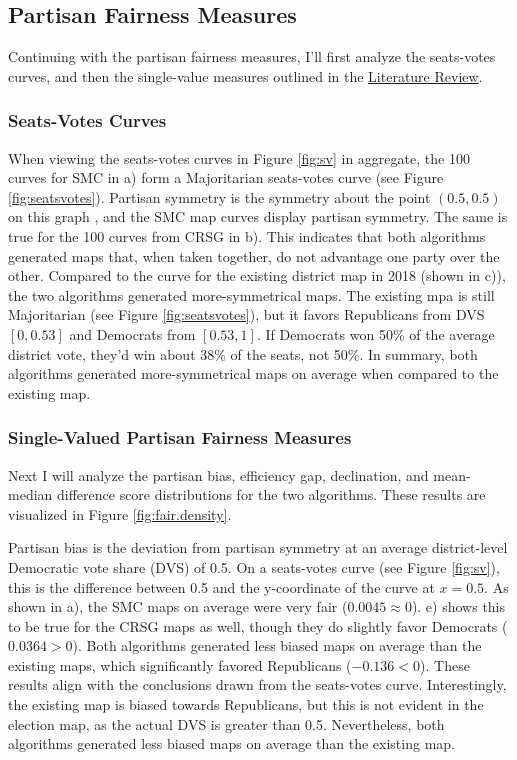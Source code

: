\subsection{Partisan Fairness Measures}

Continuing with the partisan fairness measures, I'll first analyze the seats-votes curves, and then the single-value measures outlined in the \hyperref[sec:litreview]{Literature Review}. 

\subsubsection{Seats-Votes Curves}

When viewing the seats-votes curves in Figure \ref{fig:sv} in aggregate, the 100 curves for SMC in a) form a Majoritarian seats-votes curve (see Figure \ref{fig:seatsvotes}). Partisan symmetry is the symmetry about the point $(0.5, 0.5)$ on this graph \parencite{katz2020}, and the SMC map curves display partisan symmetry. The same is true for the 100 curves from CRSG in b). This indicates that both algorithms generated maps that, when taken together, do not advantage one party over the other. Compared to the curve for the existing district map in 2018 (shown in c)), the two algorithms generated more-symmetrical maps. The existing mpa is still Majoritarian (see Figure \ref{fig:seatsvotes}), but it favors Republicans from DVS $[0, 0.53]$ and Democrats from $[0.53, 1]$. If Democrats won 50\% of the average district vote, they'd win about 38\% of the seats, not 50\%. In summary, both algorithms generated more-symmetrical maps on average when compared to the existing map. 

\subsubsection{Single-Valued Partisan Fairness Measures}

Next I will analyze the partisan bias, efficiency gap, declination, and mean-median difference score distributions for the two algorithms. These results are visualized in Figure \ref{fig:fair.density}.

Partisan bias is the deviation from partisan symmetry at an average district-level Democratic vote share (DVS) of 0.5. On a seats-votes curve (see Figure \ref{fig:sv}), this is the difference between 0.5 and the y-coordinate of the curve at $x=0.5$. As shown in a), the SMC maps on average were very fair ($0.0045 \approx 0$). e) shows this to be true for the CRSG maps as well, though they do slightly favor Democrats ($0.0364 > 0$). Both algorithms generated less biased maps on average than the existing maps, which significantly favored Republicans ($-0.136 < 0$). These results align with the conclusions drawn from the seats-votes curve. Interestingly, the existing map is biased towards Republicans, but this is not evident in the election map, as the actual DVS is greater than 0.5. Nevertheless, both algorithms generated less biased maps on average than the existing map. 

